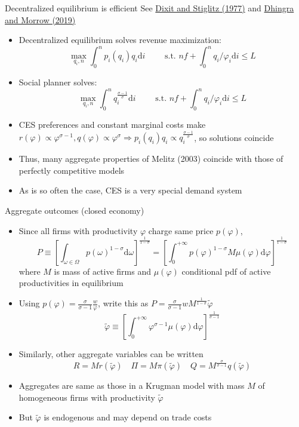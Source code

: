 \documentclass[10pt,notes=hide]{beamer}
\begin{document}
\begin{frame}{Decentralized equilibrium is efficient}
See \href{https://www.jstor.org/stable/1831401}{Dixit and Stiglitz (1977)} and \href{https://www.journals.uchicago.edu/doi/pdfplus/10.1086/700732}{Dhingra and Morrow (2019)}
\begin{itemize}
\item Decentralized equilibrium solves revenue maximization:
$$
\max_{q_i,n} \int_{0}^{n} p_i(q_i) q_i \textrm{d}i 
\qquad
\text{ s.t. }
nf +  \int_{0}^{n} q_i / \varphi_{i} \textrm{d}i \leq L
$$
\item Social planner solves:
$$
\max_{q_i,n} \int_{0}^{n} q_i^{\frac{\sigma-1}{\sigma}} \textrm{d}i 
\qquad
\text{ s.t. }
nf +  \int_{0}^{n} q_i / \varphi_{i} \textrm{d}i \leq L
$$
\item CES preferences and constant marginal costs make 
$r(\varphi) \propto \varphi^{\sigma-1}, q(\varphi) \propto \varphi^{\sigma}\Rightarrow p_i(q_i) q_i \propto q_i^{\frac{\sigma-1}{\sigma}}$, so solutions coincide
\item Thus, many aggregate properties of Melitz (2003) coincide with those of perfectly competitive models
\item As is so often the case, CES is a very special demand system
\end{itemize}
\end{frame}
\begin{frame}{Aggregate outcomes (closed economy)}
\begin{itemize}
\item Since all firms with productivity $\varphi$ charge same price $p(\varphi)$,
$$
P
\equiv
\left[\int_{\omega\in\Omega} p(\omega)^{1-\sigma} \textrm{d} \omega \right]^{\frac{1}{1-\sigma}} 
=
\left[\int_{0}^{+\infty} p(\varphi)^{1-\sigma} M \mu(\varphi) \textrm{d} \varphi \right]^{\frac{1}{1-\sigma}} 
$$
where $M$ is mass of active firms and $\mu(\varphi)$ conditional pdf of active productivities in equilibrium
\item Using $p(\varphi) = \frac{\sigma}{\sigma-1}\frac{w}{\varphi}$, write this as $P = \frac{\sigma}{\sigma-1} w M^{\frac{1}{1-\sigma}} \tilde{\varphi}$
$$
\tilde{\varphi} \equiv \left[\int_{0}^{+\infty} \varphi^{\sigma-1} \mu(\varphi) \textrm{d} \varphi \right]^{\frac{1}{\sigma-1}}
$$
\item Similarly, other aggregate variables can be written
$$
R = M r(\tilde{\varphi})
\quad
\Pi = M \pi(\tilde{\varphi})
\quad
Q = M^{\frac{\sigma}{\sigma-1}} q(\tilde{\varphi})
$$
\item Aggregates are same as those in a Krugman model with mass $M$ of homogeneous firms with productivity $\tilde{\varphi}$
\item But $\tilde{\varphi}$ is endogenous and may depend on trade costs
\end{itemize}
\end{frame}
\end{document}
